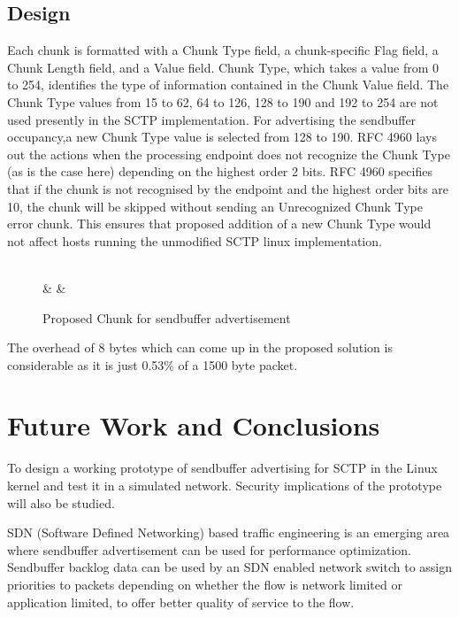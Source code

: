 \documentclass[a4paper,11pt]{article}
\begin{document}
\subsection{Design}
Each chunk is formatted with a Chunk Type field, a chunk-specific Flag field,
a Chunk Length field, and a Value field. Chunk Type, which takes a value
from 0 to 254, identifies the type of information contained in the Chunk
Value field. The Chunk Type values from 15 to 62, 64 to 126, 128 to 190 and
192 to 254 are not used presently in the SCTP implementation.
For advertising the sendbuffer occupancy,a new Chunk Type value is selected
from 128 to 190. RFC 4960 \cite{rfc4960} lays out the actions when
the processing endpoint does not recognize the Chunk Type (as is
the case here) depending on the highest order 2 bits. RFC 4960 \cite{rfc4960}
specifies that if the chunk is not recognised by the endpoint and the
highest order bits are 10, the chunk will be skipped without sending
an Unrecognized Chunk Type error chunk. This ensures that proposed
addition of a new Chunk Type would not affect hosts running the
unmodified SCTP linux implementation.

\begin{figure}[h]
	\centering
	\begin{bytefield}[bitwidth=1.1em]{32}
	\\
	 &  & \\
	\end{bytefield}
	\caption{Proposed Chunk for sendbuffer advertisement}
\end{figure}

The overhead of 8 bytes which can come up in the proposed solution
is considerable as it is just 0.53\% of a 1500 byte packet.


\section{Future Work and Conclusions}
To design a working prototype of sendbuffer advertising for SCTP in the Linux
kernel and test it in a simulated network. Security implications of the
prototype will also be studied.


SDN (Software Defined Networking) based traffic engineering is an emerging area where
sendbuffer advertisement can be used for
performance optimization. Sendbuffer backlog data can be used by
an SDN enabled network switch to assign priorities to packets
depending on whether the flow is network limited or
application limited, to offer better quality of service to the flow.
\end{document}

